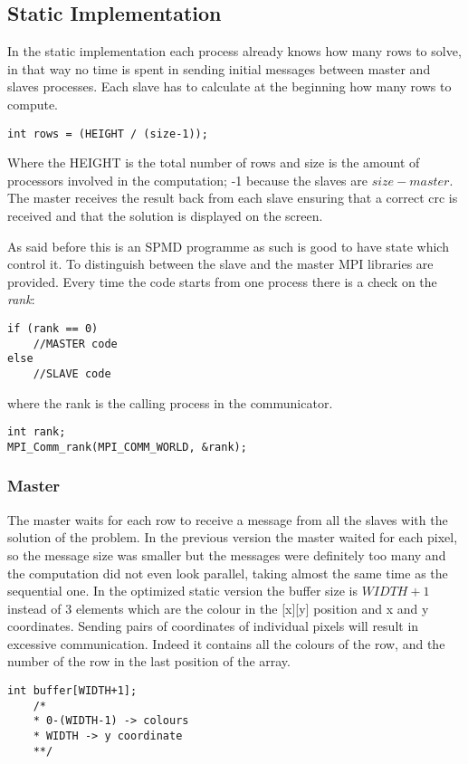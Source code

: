 \documentclass[11pt,conference]{IEEEtran}
\begin{document}
\subsection{Static Implementation}
In the static implementation each process already knows how many rows to solve, in that way no time is spent in sending initial messages between master and slaves processes. Each slave has to calculate at the beginning how many rows to compute.
\begin{lstlisting}
int rows = (HEIGHT / (size-1));
\end{lstlisting}
Where the HEIGHT is the total number of rows and size is the amount of processors involved in the computation; -1 because the slaves are $ size - master$.
The master receives the result back from each slave ensuring that a correct crc is received and that the solution is displayed on the screen.

As said before this is an SPMD programme as such is good to have state which control it. To distinguish between the slave and the master MPI libraries are provided. Every time the code starts from one process there is a check on the \textit{rank}:
\begin{lstlisting}
if (rank == 0)
	//MASTER code
else
	//SLAVE code
\end{lstlisting}
where the rank is the calling process in the communicator.
\begin{lstlisting}
int rank;
MPI_Comm_rank(MPI_COMM_WORLD, &rank);
\end{lstlisting}
\subsubsection{\textbf{Master}}
The master waits for each row to receive a message from all the slaves with the solution of the problem. In the previous version the master waited for each pixel, so the message size was smaller but the messages were definitely too many and the computation did not even look parallel, taking almost the same time as the sequential one.
\newline
In the optimized static version the buffer size is $ WIDTH + 1 $ instead of 3 elements which are the colour in the [x][y] position and x and y coordinates. Sending pairs of coordinates of individual pixels will result in  excessive communication. Indeed it contains all the colours of the row, and the number of the row in the last position of the array.
\begin{lstlisting}
int buffer[WIDTH+1];
	/*
	* 0-(WIDTH-1) -> colours
	* WIDTH -> y coordinate
	**/
\end{lstlisting}
\end{document}
